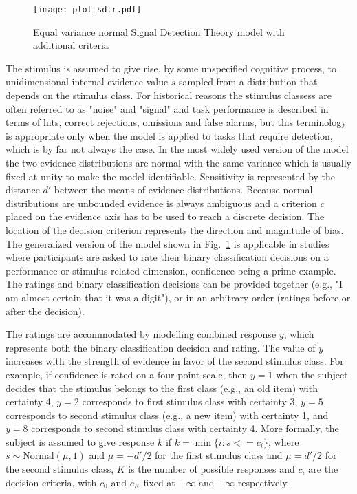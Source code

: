 \documentclass[oneside,a4paper]{article}
\begin{document}
\begin{figure}[H]
  \centering
  \texttt{[image: plot\_sdtr.pdf]}
  \caption{Equal variance normal Signal Detection Theory model with
    additional criteria}
  \label{fig:1}
\end{figure}

The stimulus is assumed to give rise, by some unspecified cognitive
process, to unidimensional internal evidence value $s$ sampled from a
distribution that depends on the stimulus class. For historical
reasons the stimulus classess are often referred to as "noise" and
"signal" and task performance is described in terms of hits, correct
rejections, omissions and false alarms, but this terminology is
appropriate only when the model is applied to tasks that require
detection, which is by far not always the case. In the most widely
used version of the model the two evidence distributions are normal
with the same variance which is usually fixed at unity to make the
model identifiable. Sensitivity is represented by the distance $d'$
between the means of evidence distributions. Because normal
distributions are unbounded evidence is always ambiguous and a
criterion $c$ placed on the evidence axis has to be used to reach a
discrete decision. The location of the decision criterion represents
the direction and magnitude of bias. The generalized version of the
model shown in Fig.~\ref{fig:1} is applicable in studies where
participants are asked to rate their binary classification decisions
on a performance or stimulus related dimension, confidence being a
prime example. The ratings and binary classification decisions can be
provided together (e.g., "I am almost certain that it was a digit"),
or in an arbitrary order (ratings before or after the decision).

The ratings are accommodated by modelling combined response $y$, which
represents both the binary classification decision and rating. The
value of $y$ increases with the strength of evidence in favor of the
second stimulus class. For example, if confidence is rated on a
four-point scale, then $y = 1$ when the subject decides that the
stimulus belongs to the first class (e.g., an old item) with certainty
4, $y = 2$ corresponds to first stimulus class with certainty 3,
$y = 5$ corresponds to second stimulus class (e.g., a new item) with
certainty 1, and $y = 8$ corresponds to second stimulus class with
certainty 4. More formally, the subject is assumed to give response
$k$ if $k = \min \{i : s <= c_i\}$, where
$s \sim \text{Normal}(\mu, 1)$ and $\mu = -d'/2$ for the first
stimulus class and $\mu = d'/2$ for the second stimulus class, $K$ is
the number of possible responses and $c_i$ are the decision criteria,
with $c_0$ and $c_K$ fixed at $-\infty$ and $+\infty$ respectively.
\end{document}
